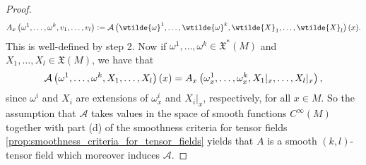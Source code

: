 \begin{proof}
	\begin{equation}
		\label{eq:def_A}
		A_x\del[1]{\omega^1,\dots,\omega^k,v_1,\dots,v_l} := \mathcal{A}\del[1]{\wtilde{\omega}^1,\dots,\wtilde{\omega}^k,\wtilde{X}_1,\dots,\wtilde{X}_l}(x).
	\end{equation}
	This is well-defined by step 2. Now if $\omega^1,\dots,\omega^k \in \mathfrak{X}^*(M)$ and $X_1,\dots,X_l \in \mathfrak{X}(M)$, we have that 
	\begin{equation*}
		\mathcal{A}\del[1]{\omega^1,\dots,\omega^k,X_1,\dots,X_l}(x) = A_x\del[1]{\omega^1_x,\dots,\omega^k_x,X_1\vert_x,\dots,X_l\vert_x},
	\end{equation*}
	\noindent since $\omega^i$ and $X_i$ are extensions of $\omega^i_x$ and $X_i\vert_x$, respectively, for all $x \in M$. So the assumption that $\mathcal{A}$ takes values in the space of smooth functions $C^\infty(M)$ together with part (d) of the smoothness criteria for tensor fields \ref{prop:smoothness_criteria_for_tensor_fields} yields that $A$ is a smooth $(k,l)$-tensor field which moreover induces $\mathcal{A}$.
\end{proof}
